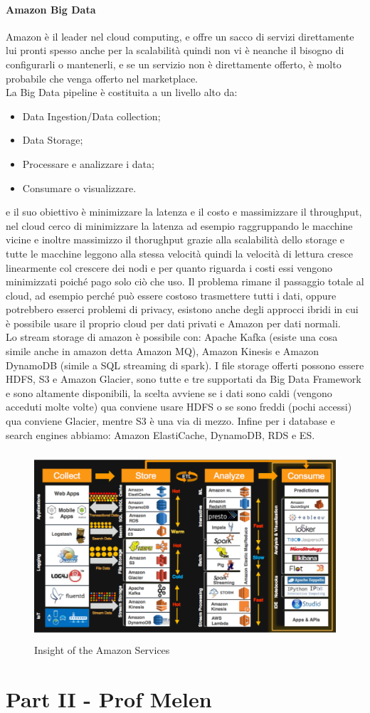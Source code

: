 \documentclass[11pt, twocolumn]{article}
\newenvironment{myitemize}
{ \begin{itemize}[topsep=0ex]
		\setlength{\itemsep}{0pt}
		\setlength{\parskip}{0pt}
		\setlength{\parsep}{0pt}     }
	{ \end{itemize}                  }
\begin{document}
\subsection{Amazon Big Data}
Amazon è il leader nel cloud computing, e offre un sacco di servizi direttamente lui pronti spesso anche per la scalabilità quindi non vi è neanche il bisogno di configurarli o mantenerli, e se un servizio non è direttamente offerto, è molto probabile che venga offerto nel marketplace. \\
La Big Data pipeline è costituita a un livello alto da:
\begin{myitemize}
	\item Data Ingestion/Data collection;
	\item Data Storage;
	\item Processare e analizzare i data;
	\item Consumare o visualizzare.
\end{myitemize}
e il suo obiettivo è minimizzare la latenza e il costo e massimizzare il throughput, nel cloud cerco di minimizzare la latenza ad esempio raggruppando le macchine vicine e inoltre massimizzo il thorughput grazie alla scalabilità dello storage e tutte le macchine leggono alla stessa velocità quindi la velocità di lettura cresce linearmente col crescere dei nodi e per quanto riguarda i costi essi vengono minimizzati poiché pago solo ciò che uso.
Il problema rimane il passaggio totale al cloud, ad esempio perché può essere costoso trasmettere tutti i dati, oppure potrebbero esserci problemi di privacy, esistono anche degli approcci ibridi in cui è possibile usare il proprio cloud per dati privati e Amazon per dati normali.\\
Lo stream storage di amazon è possibile con: Apache Kafka (esiste una cosa simile anche in amazon detta Amazon MQ), Amazon Kinesis e Amazon DynamoDB (simile a SQL streaming di spark). 
I file storage offerti possono essere HDFS, S3 e Amazon Glacier, sono tutte e tre supportati da Big Data Framework e sono altamente disponibili, la scelta avviene se i dati sono caldi (vengono acceduti molte volte) qua conviene usare HDFS o se sono freddi (pochi accessi) qua conviene Glacier, mentre S3 è una via di mezzo. Infine per i database e search engines abbiamo: Amazon ElastiCache, DynamoDB, RDS e ES.

\begin{figure}
	\centering
	\includegraphics[width=\linewidth,height=7cm]{imgs/amazon_insight.png}
	\caption{Insight of the Amazon Services}
	\label{fig:amazon}
\end{figure}

\newpage

\part*{Part II - Prof Melen}
\end{document}
